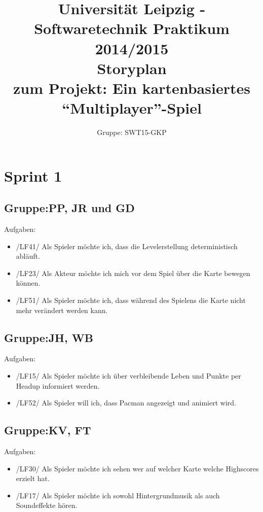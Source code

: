 \documentclass[11pt,a4paper]{article}
\author{Gruppe: SWT15-GKP}
\title{Universität Leipzig - Softwaretechnik Praktikum 2014/2015 \\  Storyplan \\ zum Projekt: Ein kartenbasiertes “Multiplayer”-Spiel}
\begin{document}
\maketitle

\clearpage

\flushleft


\section*{Sprint 1}

\subsection*{Gruppe:PP, JR und GD} \par\bigskip
Aufgaben:
\begin{itemize}
\item /LF41/ Als Spieler möchte ich, dass die Levelerstellung deterministisch abläuft.
\item /LF23/ Als Akteur möchte ich mich vor dem Spiel über die Karte bewegen können.
\item /LF51/ Als Spieler möchte ich, dass während des Spielens die Karte nicht mehr verändert werden kann. 
\end{itemize}

\subsection*{Gruppe:JH, WB} \par\bigskip
Aufgaben:
\begin{itemize}
\item /LF15/ Als Spieler möchte ich über verbleibende Leben und Punkte per Headup informiert werden.
\item /LF52/ Als Spieler will ich, dass Pacman angezeigt und animiert wird.
\end{itemize}

\subsection*{Gruppe:KV, FT} \par\bigskip
Aufgaben:
\begin{itemize}
\item /LF30/ Als Spieler möchte ich sehen wer auf welcher Karte welche Highscores
erzielt hat.
\item /LF17/ Als Spieler möchte ich sowohl Hintergrundmusik als auch Soundeffekte hören.
\end{itemize}
\end{document}
